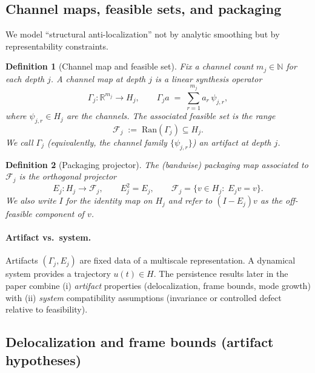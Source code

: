 \documentclass[11pt]{article}
\newcommand{\Ran}{\mathrm{Ran}}
\newtheorem{definition}{Definition}[section]
\begin{document}
\subsection{Channel maps, feasible sets, and packaging}

We model ``structural anti-localization'' not by analytic smoothing but by representability constraints.

\begin{definition}[Channel map and feasible set]\label{def:channel-map}
Fix a channel count $m_j\in\mathbb{N}$ for each depth $j$.
A \emph{channel map} at depth $j$ is a linear synthesis operator
\begin{equation}\label{eq:gamma-def}
\Gamma_j:\mathbb{R}^{m_j}\to H_j,
\qquad
\Gamma_j a \;=\; \sum_{r=1}^{m_j} a_r\,\psi_{j,r},
\end{equation}
where $\psi_{j,r}\in H_j$ are the \emph{channels}.
The associated feasible set is the range
\begin{equation}\label{eq:feasible-set}
\mathcal{F}_j \;:=\; \Ran(\Gamma_j)\subseteq H_j.
\end{equation}
We call $\Gamma_j$ (equivalently, the channel family $\{\psi_{j,r}\}$) an \emph{artifact} at depth $j$.
\end{definition}

\begin{definition}[Packaging projector]\label{def:packaging}
The (bandwise) packaging map associated to $\mathcal{F}_j$ is the orthogonal projector
\begin{equation}\label{eq:packaging-proj}
E_j:H_j\to \mathcal{F}_j,
\qquad
E_j^2 = E_j,
\qquad
\mathcal{F}_j = \{v\in H_j:\;E_j v=v\}.
\end{equation}
We also write $I$ for the identity map on $H_j$ and refer to $(I-E_j)v$ as the \emph{off-feasible component} of $v$.
\end{definition}

\paragraph{Artifact vs.\ system.}
Artifacts $(\Gamma_j,E_j)$ are fixed data of a multiscale representation.
A dynamical system provides a trajectory $u(t)\in H$.
The persistence results later in the paper combine (i) \emph{artifact} properties (delocalization, frame bounds, mode growth) with (ii) \emph{system} compatibility assumptions (invariance or controlled defect relative to feasibility).

\subsection{Delocalization and frame bounds (artifact hypotheses)}
\end{document}

